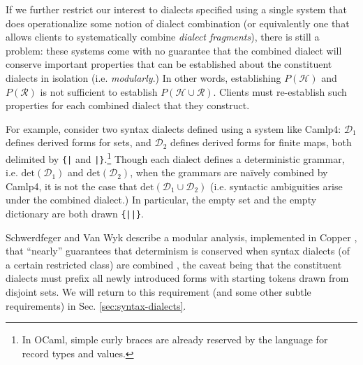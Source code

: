 If we further restrict our interest  to dialects specified using a single system that does operationalize some notion of dialect combination (or equivalently one that allows clients to systematically combine \emph{dialect fragments}), there is still a problem: these systems come with no guarantee that the combined dialect will conserve important properties that can be established about the constituent dialects in isolation (i.e. \emph{modularly}.) In other words, establishing $P(\mathcal{H})$ and $P(\mathcal{R})$ is not sufficient to establish $P(\mathcal{H} \cup \mathcal{R})$. Clients must re-establish such properties for each combined dialect that they construct.%

For example, consider two syntax dialects defined using a system like Camlp4: $\mathcal{D}_1$ defines derived forms for sets, and $\mathcal{D}_2$ defines derived forms for finite maps, both delimited by \verb~{|~ and \verb~|}~.\footnote{In OCaml, simple curly braces are already reserved by the language for record types and values.} Though each dialect defines a deterministic grammar, i.e. $\mathrm{det}(\mathcal{D}_1)$ and $\mathrm{det}(\mathcal{D}_2)$, when the grammars are na\"ively combined by Camlp4, it is not the case that $\mathrm{det}(\mathcal{D}_1 \cup \mathcal{D}_2)$ (i.e. syntactic ambiguities arise under the combined dialect.) In particular, the empty set and the empty dictionary are both drawn \verb~{||}~. %

Schwerdfeger and Van Wyk describe a modular analysis, implemented in Copper \cite{conf/gpce/WykS07}, that ``nearly'' guarantees that determinism is conserved when syntax dialects (of a certain restricted class) are combined \cite{conf/pldi/SchwerdfegerW09}, the caveat being that the constituent dialects must prefix all newly introduced forms with starting tokens drawn from disjoint sets. We will return to this requirement (and some other subtle requirements) in Sec. \ref{sec:syntax-dialects}.


